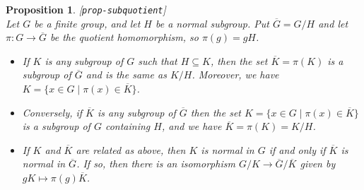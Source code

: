 \documentclass{amsart}
\newcommand{\lbl}[1]{\label{#1}\textup{[\texttt{#1}]}\ \\}
\newcommand{\lbl}{\label}
\newcommand{\ov}[1]     {\overline{#1}}
\newcommand{\st}        {\;|\;}
\newcommand{\sse}       {\subseteq}
\renewcommand{\:}{\colon}
\newtheorem{proposition}[theorem]{Proposition}
\theoremstyle{definition}
\begin{document}
\begin{proposition}\lbl{prop-subquotient}
 Let $G$ be a finite group, and let $H$ be a normal subgroup.  Put
 $\ov{G}=G/H$ and let $\pi\:G\to\ov{G}$ be the quotient homomorphism,
 so $\pi(g)=gH$.
 \begin{itemize}
  \item[(a)] If $K$ is any subgroup of $G$ such that $H\sse K$, then
   the set $\ov{K}=\pi(K)$ is a subgroup of $\ov{G}$ and is the same
   as $K/H$.  Moreover, we have $K=\{x\in G\st\pi(x)\in\ov{K}\}$.
  \item[(b)] Conversely, if $\ov{K}$ is any subgroup of $\ov{G}$ then
   the set $K=\{x\in G\st\pi(x)\in\ov{K}\}$ is a subgroup of $G$
   containing $H$, and we have $\ov{K}=\pi(K)=K/H$.
  \item[(c)] If $K$ and $\ov{K}$ are related as above, then $K$ is
   normal in $G$ if and only if $\ov{K}$ is normal in $\ov{G}$.  If
   so, then there is an isomorphism $G/K\to\ov{G}/\ov{K}$ given by
   $gK\mapsto\pi(g)\ov{K}$.
 \end{itemize}
\end{proposition}
\end{document}
